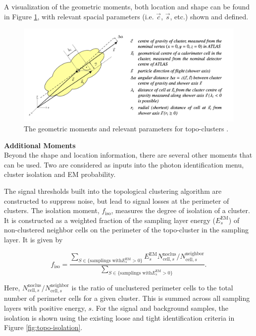 A visualization of the geometric moments, both location and shape can be found in Figure \ref{fig:topo-geom}, with relevant spacial parameters (i.e. $\vec{c}$, $\vec{s}$, etc.) shown and defined.

\begin{figure}[htb]
    \centering
    \includegraphics[width=.90\textwidth]{chapters/chapter4_photonID/images/geom-moments.png}

    \caption[The geometric moments and relevant parameters for topo-clusters.]
    {The geometric moments and relevant parameters for topo-clusters \cite{topo-clustering-r1}.}
    \label{fig:topo-geom}
\end{figure}


\noindent\textbf{Additional Moments}\\
\indent Beyond the shape and location information, there are several other moments that can be used. Two are considered as inputs into the photon identification menu, cluster isolation and \gls{EM} probability.

The signal thresholds built into the topological clustering algorithm are constructed to suppress noise, but lead to signal losses at the perimeter of clusters. The isolation moment, $f_{\text{iso}}$, measures the degree of isolation of a cluster. It is constructed as a weighted fraction of the sampling layer energy ($E_{s}^{\text{EM}}$) of non-clustered neighbor cells on the perimeter of the topo-cluster in the sampling layer. It is given by

\begin{equation}
    f_{\text{iso}} = \frac
    {
    \sum_{S \in \{ \text{samplings with} E_{s}^{\text{EM}} > 0 \} }  
    E_{s}^{\text{EM}} N_{\text{cell},s}^{\text{noclus}} / N_{\text{cell},s}^{\text{neighbor}}
    } 
    {
        \sum_{S \in \{ \text{samplings with} E_{s}^{\text{EM}} > 0 \} }
    }.
\end{equation}

Here, $N_{\text{cell},s}^{\text{noclus}} / N_{\text{cell},s}^{\text{neighbor}}$ is the ratio of unclustered perimeter cells to the total number of perimeter cells for a given cluster. This is summed across all sampling layers with positive energy, $s$. For the signal and background samples, the isolation is shown using the existing loose and tight identification criteria in Figure \ref{fig:topo-isolation}.

